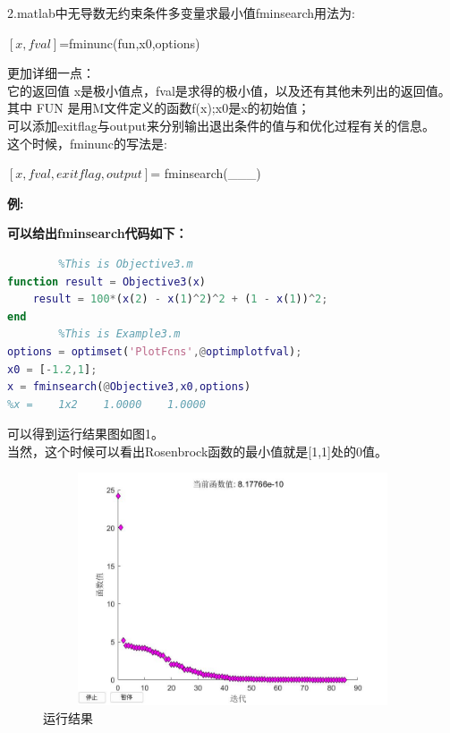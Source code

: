 \documentclass[a4paper,20pt]{article}
\begin{document}
    \par 2.matlab中无导数无约束条件多变量求最小值fminsearch用法为:
    \begin{center}
        $\left[x,fval\right] $=fminunc(fun,x0,options)
    \end{center}
    \par \noindent 更加详细一点：
    \\它的返回值 x是极小值点，fval是求得的极小值，以及还有其他未列出的返回值。
    \\其中 FUN 是用M文件定义的函数f(x);x0是x的初始值；
    \\可以添加exitflag与output来分别输出退出条件的值与和优化过程有关的信息。
    \\这个时候，fminunc的写法是:
    \begin{center}
        \par \noindent $\left[x,fval,exitflag,output \right]$= fminsearch(\_\_\_)
    \end{center}
    \par \textbf{例:}
    \par \noindent {}
    \par \noindent \textbf{可以给出fminsearch代码如下：}
    \begin{center}
        \begin{lstlisting}[caption={fminsearch},language=Matlab]
% NonLinear Programming
        %This is Objective3.m
function result = Objective3(x)
    result = 100*(x(2) - x(1)^2)^2 + (1 - x(1))^2;
end
        %This is Example3.m
options = optimset('PlotFcns',@optimplotfval);
x0 = [-1.2,1];
x = fminsearch(@Objective3,x0,options)
%x =    1x2    1.0000    1.0000

        \end{lstlisting}
    \end{center}
    \par \noindent 可以得到运行结果图如图1。
    \\当然，这个时候可以看出Rosenbrock函数的最小值就是[1,1]处的0值。
    \begin{center}
        \begin{figure}[H]
            \includegraphics[width=340pt,height=195pt]{Example3.jpg}
            \caption{运行结果}
        \end{figure}
    \end{center}
\end{document}
